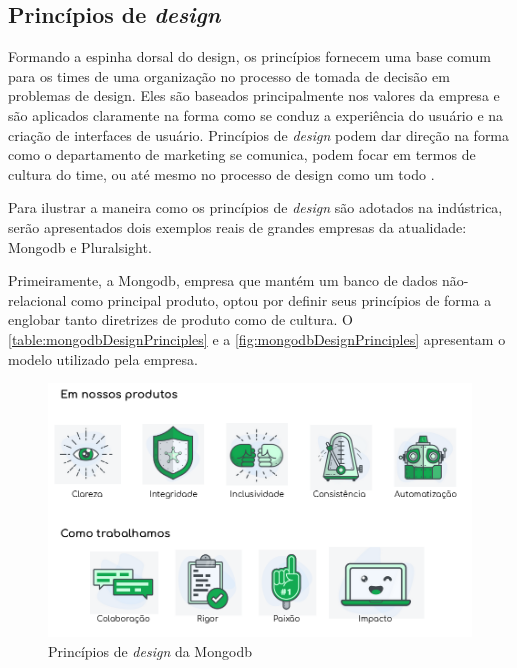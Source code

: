 \subsection{Princípios de \textit{design}}

Formando a espinha dorsal do design, os princípios fornecem uma base comum para os times de uma organização no processo de tomada de decisão em problemas de design. Eles são baseados principalmente nos valores da empresa e são aplicados claramente na forma como se conduz a experiência do usuário e na criação de interfaces de usuário. Princípios de \textit{design} podem dar direção na forma como o departamento de marketing se comunica, podem focar em termos de cultura do time, ou até mesmo no processo de design como um todo \cite{kholmatova2017design}.

Para ilustrar a maneira como os princípios de \textit{design} são adotados na indústrica, serão apresentados dois exemplos reais de grandes empresas da atualidade: Mongodb e Pluralsight.

Primeiramente, a Mongodb, empresa que mantém um banco de dados não-relacional como principal produto, optou por definir seus princípios de forma a englobar tanto diretrizes de produto como de cultura. O \autoref{table:mongodbDesignPrinciples} e a \autoref{fig:mongodbDesignPrinciples} apresentam o modelo utilizado pela empresa.


\begin{figure}[!htb]
	\centering
	\includegraphics[width=\linewidth]{./04-figuras/02_referencial_teorico/mongodb-design-principles.png}
	\caption{Princípios de \textit{design} da Mongodb}
  \label{fig:mongodbDesignPrinciples}
\end{figure}

